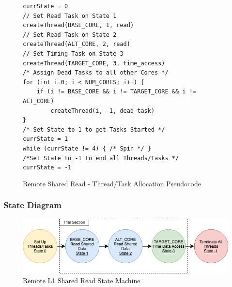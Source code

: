 \documentclass[bsc,frontabs,twoside,singlespacing,parskip,deptreport]{infthesis}     %
\begin{document}
\begin{figure}[!h]
    \centering
    \begin{minipage}{0.7\textwidth}
    \begin{verbatim}
currState = 0
// Set Read Task on State 1
createThread(BASE_CORE, 1, read)
// Set Read Task on State 2
createThread(ALT_CORE, 2, read)
// Set Timing Task on State 3
createThread(TARGET_CORE, 3, time_access)
/* Assign Dead Tasks to all other Cores */
for (int i=0; i < NUM_CORES; i++) {
    if (i != BASE_CORE && i != TARGET_CORE && i != ALT_CORE)
        createThread(i, -1, dead_task)
}
/* Set State to 1 to get Tasks Started */
currState = 1
while (currState != 4) { /* Spin */ }
/*Set State to -1 to end all Threads/Tasks */
currState = -1
    \end{verbatim}
    \end{minipage}
    \caption{Remote Shared Read - Thread/Task Allocation Pseudocode}
    \label{fig:remote-S-read-pseudo}
\end{figure}


\subsubsection{State Diagram}
\begin{figure}[!h]
    \centering
    \includegraphics[width=125mm]{SharedState.png}
    \caption{Remote L1 Shared Read State Machine}
    \label{fig:remote-S-read-state}
\end{figure}
\end{document}
